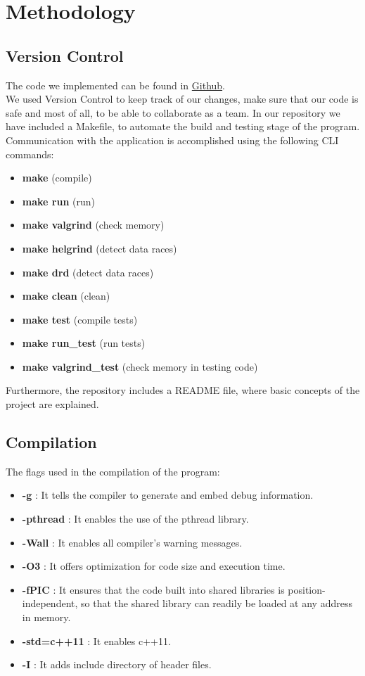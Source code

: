 \documentclass{article}
\begin{document}
\section{Methodology}
\subsection{Version Control}
The code we implemented can be found in
\href{https://github.com/nefelitav/Software-Development-for-Information-Systems}{Github}. \\
We used Version Control to keep track of our changes, make sure that our code is safe and most of all, to be able to collaborate as a team.
In our repository we have included a Makefile, to automate the build and testing stage of the program.  \\ 
Communication with the application is accomplished using the following CLI commands:
\begin{itemize}
  \item \textbf{make} (compile)
  \item \textbf{make run} (run)
  \item \textbf{make valgrind} (check memory)
  \item \textbf{make helgrind} (detect data races)
  \item \textbf{make drd} (detect data races)
  \item \textbf{make clean} (clean)
  \item \textbf{make test} (compile tests)
  \item \textbf{make run\_test} (run tests)
  \item \textbf{make valgrind\_test} (check memory in testing code)
\end{itemize}
Furthermore, the repository includes a README file, where basic concepts of the project are explained.
\subsection{Compilation}
The flags used in the compilation of the program:
\begin{itemize}
  \item \textbf{-g} : It tells the compiler to generate and embed debug information.
  \item \textbf{-pthread} : It enables the use of the pthread library.
  \item \textbf{-Wall} : It enables all compiler's warning messages.
  \item \textbf{-O3} : It offers optimization for code size and execution time.
  \item \textbf{-fPIC} : It ensures that the code built into shared libraries is position-independent, so that the shared library can readily be loaded at any address in memory.
  \item \textbf{-std=c++11} : It enables c++11.
  \item \textbf{-I} : It adds include directory of header files.
\end{itemize}
\end{document}

